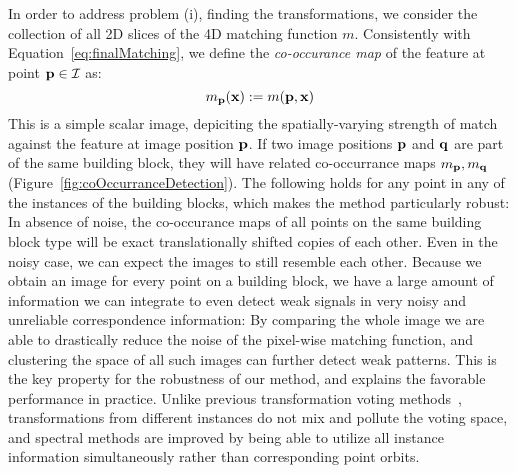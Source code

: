 \documentclass{acmtog}
\begin{document}
In order to address problem (i), finding the transformations, we consider the collection of all 2D slices of the 4D matching function $m$. Consistently with Equation~\ref{eq:finalMatching}, we define the \emph{co-occurance map} of the feature at point $\mathbf{p} \in \mathcal{I}$ as:
%
\begin{equation}
m_{\mathbf{p}}(\mathbf{x}) := m(\mathbf{p}, \mathbf{x})
\label{eq:corr-map}
\end{equation}
%
This is a simple scalar image, depiciting the spatially-varying strength of match against the feature at image position $\mathbf{p}$. If two image positions $\mathbf{p}$ and $\mathbf{q}$ are part of the same building block, they will have related co-occurrance maps $m_{\mathbf{p}},m_{\mathbf{q}}$ (Figure~\ref{fig:coOccurranceDetection}). The following holds for any point in any of the instances of the building blocks, which makes the method particularly robust:
In absence of noise, the co-occurance maps of all points on the same building block type will be exact translationally shifted copies of each other. Even in the noisy case, we can expect the images to still resemble each other. Because we obtain an image for every point on a building block, we have a large amount of information we can integrate to even detect weak signals in very noisy and unreliable correspondence information: By comparing the whole image we are able to drastically reduce the noise of the pixel-wise matching function, and clustering the space of all such images can further detect weak patterns. This is the key property for the robustness of our method, and explains the favorable performance in practice. Unlike previous transformation voting methods~\cite{Mitra2006PAA}, transformations from different instances do not mix and pollute the voting space, and spectral methods are improved by being able to utilize all instance information simultaneously rather than corresponding point orbits.
\end{document}
